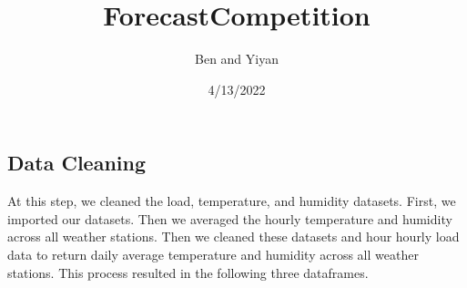 \documentclass[
]{article}
\title{ForecastCompetition}
\author{Ben and Yiyan}
\date{4/13/2022}
\begin{document}
\maketitle

\hypertarget{data-cleaning}{%
\subsection{Data Cleaning}\label{data-cleaning}}

At this step, we cleaned the load, temperature, and humidity datasets.
First, we imported our datasets. Then we averaged the hourly temperature
and humidity across all weather stations. Then we cleaned these datasets
and hour hourly load data to return daily average temperature and
humidity across all weather stations. This process resulted in the
following three dataframes.
\end{document}
